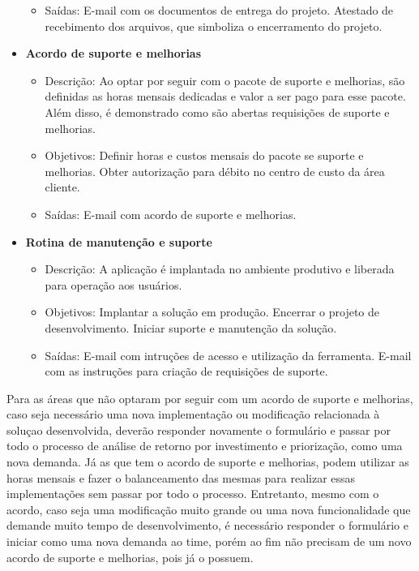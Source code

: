 \begin{itemize}
\begin{itemize}
			\item Saídas: E-mail com os documentos de entrega do projeto. Atestado de recebimento dos arquivos, que simboliza o encerramento do projeto.
		\end{itemize}
		\item \textbf{Acordo de suporte e melhorias}
		\begin{itemize}
			\item Descrição: Ao optar por seguir com o pacote de suporte e melhorias, são definidas as horas mensais dedicadas e valor a ser pago para esse pacote. Além disso, é demonstrado como são abertas requisições de suporte e melhorias.
			\item Objetivos: Definir horas e custos mensais do pacote se suporte e melhorias. Obter autorização para débito no centro de custo da área cliente.
			\item Saídas: E-mail com acordo de suporte e melhorias.
		\end{itemize}
		\item \textbf{Rotina de manutenção e suporte}
		\begin{itemize}
			\item Descrição: A aplicação é implantada no ambiente produtivo e liberada para operação aos usuários.
			\item Objetivos: Implantar a solução em produção. Encerrar o projeto de desenvolvimento. Iniciar suporte e manutenção da solução.
			\item Saídas: E-mail com intruções de acesso e utilização da ferramenta. E-mail com as instruções para criação de requisições de suporte.
		\end{itemize}
	\end{itemize}

	Para as áreas que não optaram por seguir com um acordo de suporte e melhorias, caso seja necessário uma nova implementação ou modificação relacionada à soluçao desenvolvida, deverão responder novamente o formulário e passar por todo o processo de análise de retorno por investimento e priorização, como uma nova demanda.
	Já as que tem o acordo de suporte e melhorias, podem utilizar as horas mensais e fazer o balanceamento das mesmas para realizar essas implementações sem passar por todo o processo. Entretanto, mesmo com o acordo, caso seja uma modificação muito grande ou uma nova funcionalidade que demande muito tempo de desenvolvimento, é necessário responder o formulário e iniciar como uma nova demanda ao time, porém ao fim não precisam de um novo acordo de suporte e melhorias, pois já o possuem.

